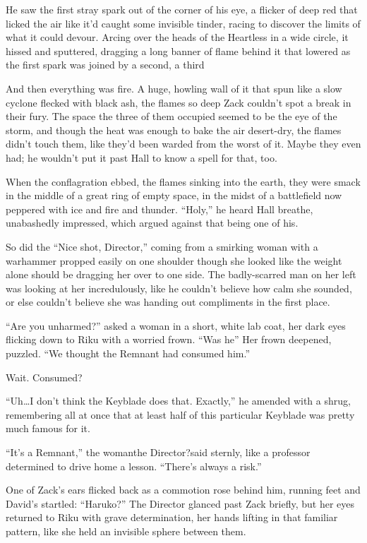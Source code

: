 He saw the first stray spark out of the corner of his eye, a flicker of deep red that licked the air like it'd caught some invisible tinder, racing to discover the limits of what it could devour. Arcing over the heads of the Heartless in a wide circle, it hissed and sputtered, dragging a long banner of flame behind it that lowered as the first spark was joined by a second, a third\textemdash 

And then everything was fire. A huge, howling wall of it that spun like a slow cyclone flecked with black ash, the flames so deep Zack couldn't spot a break in their fury. The space the three of them occupied seemed to be the eye of the storm, and though the heat was enough to bake the air desert-dry, the flames didn't touch them, like they'd been warded from the worst of it. Maybe they even had; he wouldn't put it past Hall to know a spell for that, too.

When the conflagration ebbed, the flames sinking into the earth, they were smack in the middle of a great ring of empty space, in the midst of a battlefield now peppered with ice and fire and thunder. ``Holy,'' he heard Hall breathe, unabashedly impressed, which argued against that being one of his.

So did the ``Nice shot, Director,'' coming from a smirking woman with a warhammer propped easily on one shoulder though she looked like the weight alone should be dragging her over to one side. The badly-scarred man on her left was looking at her incredulously, like he couldn't believe how calm she sounded, or else couldn't believe she was handing out compliments in the first place.

``Are you unharmed?'' asked a woman in a short, white lab coat, her dark eyes flicking down to Riku with a worried frown. ``Was he\textemdash '' Her frown deepened, puzzled. ``We thought the Remnant had consumed him.''

Wait. Consumed?

``Uh\ldots I don't think the Keyblade does that. Exactly,'' he amended with a shrug, remembering all at once that at least half of this particular Keyblade was pretty much famous for it.

``It's a Remnant,'' the woman\textemdash the Director?\textemdash said sternly, like a professor determined to drive home a lesson. ``There's always a risk.''

One of Zack's ears flicked back as a commotion rose behind him, running feet and David's startled: ``Haruko?'' The Director glanced past Zack briefly, but her eyes returned to Riku with grave determination, her hands lifting in that familiar pattern, like she held an invisible sphere between them.

